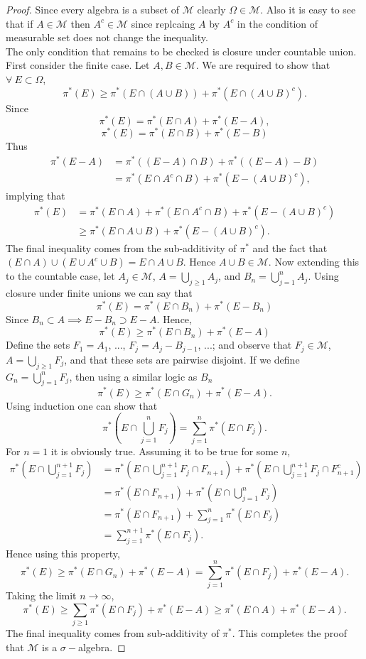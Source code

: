  \begin{proof}
   Since every algebra is a subset of $ \mathscr{M}$ clearly $\Omega \in \mathscr{M}$. Also it is easy to see that if $A\in \mathscr{M}$ then $A^c \in \mathscr{M}$ since replcaing $A$ by $A^c$ in the condition of measurable set does not change the inequality.\\
   The only condition that remains to be checked is closure under countable union. First consider the finite case. Let $A, B \in \mathscr{M}$. We are required to show that $\forall\ E\subset \Omega$,
   \[\pi^*(E) \geq \pi^*(E\cap (A\cup B)) + \pi^*(E\cap (A\cup B)^c).\]
   Since
   \[\pi^*(E) = \pi^*(E\cap A) + \pi^*(E-A),\]
   \[\pi^*(E) = \pi^*(E\cap B) + \pi^*(E-B)\]
   Thus
   \begin{align*}
     \pi^*(E-A) &= \pi^*((E-A)\cap B) + \pi^*((E-A)-B)\\
             &= \pi^*(E\cap A^c \cap B) + \pi^*(E-(A\cup B)^c),
   \end{align*}
   implying that
   \begin{align*}
     \pi^*(E) &= \pi^*(E\cap A) +\pi^*(E\cap A^c \cap B) + \pi^*(E-(A\cup B)^c)\\
           &\geq \pi^*(E\cap A \cup B)+ \pi^*(E-(A\cup B)^c).
   \end{align*}
   The final inequality comes from the sub-additivity of $\pi^*$ and the fact that $(E\cap A) \cup (E \cup A^c \cup B) = E \cap A \cup B$. Hence $A\cup B \in \mathscr{M}$. Now extending this to the countable case, let $A_j \in \mathscr{M}$, $A = \bigcup_{j\geq 1}A_j$, and $B_n = \bigcup_{j= 1}^{n} A_{j}$. Using closure under finite unions we can say that
   \[\pi^*(E) = \pi^*(E\cap B_n) + \pi^*(E-B_n)\]
   Since $B_n \subset A\implies E-B_n \supset E-A$. Hence,
   \[\pi^*(E) \geq \pi^*(E\cap B_n) + \pi^*(E-A)\]
   Define the sets $F_1 = A_1$, ..., $F_j = A_j - B_{j-1}$, ...; and observe that $F_j \in \mathscr{M}$, $A = \bigcup_{j\geq1} F_j$, and that these sets are pairwise disjoint. If we define $G_n = \bigcup_{j=1}^n F_j$, then using a similar logic as $B_n$
   \[\pi^*(E) \geq \pi^*(E\cap G_n) + \pi^*(E-A).\]
   Using induction one can show that
   \[\pi^*(E \cap \bigcup_{j=1}^n F_j) = \sum_{j=1}^n \pi^*(E\cap F_j).\]
   For $n=1$ it is obviously true. Assuming it to be true for some $n$,
   \begin{align*}
     \pi^*(E \cap \bigcup_{j=1}^{n+1} F_j) &= \pi^*(E \cap \bigcup_{j=1}^{n+1} F_j \cap F_{n+1}) + \pi^*(E \cap \bigcup_{j=1}^{n+1} F_j \cap F_{n+1}^c)\\
     &= \pi^*(E\cap F_{n+1}) + \pi^*(E\cap \bigcup_{j=1}^n F_j)\\
     &= \pi^*(E\cap F_{n+1}) + \sum_{j=1}^{n}\pi^*(E\cap F_j)\\
     &= \sum_{j=1}^{n+1}\pi^*(E\cap F_j).
   \end{align*}
   Hence using this property,
   \[\pi^*(E) \geq \pi^*(E\cap G_n) + \pi^*(E-A) = \sum_{j=1}^n\pi^*(E\cap F_j) + \pi^*(E-A).\]
   Taking the limit $n\to \infty$,
   \[\pi^*(E) \geq \sum_{j\geq1}\pi^*(E\cap F_j) + \pi^*(E-A) \geq \pi^*(E\cap A) + \pi^*(E-A).\]
   The final inequality comes from sub-additivity of $\pi^*$. This completes the proof that $ \mathscr{M}$ is a $\sigma-$algebra. 
 \end{proof}

